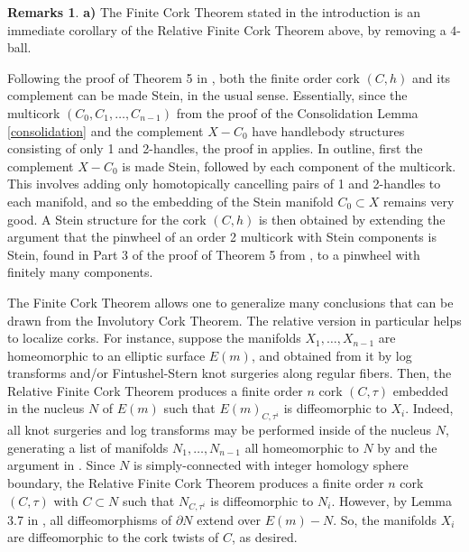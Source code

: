 \documentclass[11pt]{amsart}
\theoremstyle{definition}
\newtheorem{remarks}[theorem]{Remarks}
\begin{document}
\begin{remarks}
{\bf a)} The Finite Cork Theorem stated in the introduction is an immediate corollary of the Relative Finite Cork Theorem above, by removing a $4$-ball.

 Following the proof of Theorem 5 in \cite{akbulut-matveyev:positron}, both the finite order cork $(C,h)$ and its complement can be made Stein, in the usual sense. Essentially, since the multicork $(C_0, C_1, \dots, C_{n-1})$ from the proof of the Consolidation Lemma \ref{consolidation} and the complement $X-C_0$ have handlebody structures consisting of only 1 and 2-handles, the proof in \cite{akbulut-matveyev:positron} applies. In outline, first the complement $X-C_0$ is made Stein, followed by each component of the multicork. This involves adding only homotopically cancelling pairs of 1 and 2-handles to each manifold, and so the embedding of the Stein manifold $C_0 \subset X$ remains very good. A Stein structure for the cork $(C,h)$ is then obtained by extending the argument that the pinwheel of an order 2 multicork with Stein components is Stein, found in Part 3 of the proof of Theorem 5 from \cite{akbulut-matveyev:positron}, to a pinwheel with finitely many components. 

 The Finite Cork Theorem allows one to generalize many conclusions that can be drawn from the Involutory Cork Theorem. The relative version in particular helps to localize corks. For instance, suppose the manifolds $X_1, \dots, X_{n-1}$ are homeomorphic to an elliptic surface $E(m)$, and obtained from it by log transforms and/or Fintushel-Stern knot surgeries \cite{fs:knot-surgery} along regular fibers.  Then, the Relative Finite Cork Theorem produces a finite order $n$ cork $(C , \tau)$ embedded in the nucleus $N$ of $E(m)$ such that $E(m)_{C,\tau^i}$ is diffeomorphic to $X_i$. 
Indeed, all knot surgeries and log transforms may be performed inside of the nucleus $N$, generating a list of manifolds $N_1, \dots, N_{n-1}$ all homeomorphic to $N$ by \cite[Prop. 3.4]{gompf:nuclei} and the argument in \cite[pg.\,4]{fs:knot-surgery}.  Since $N$ is simply-connected with integer homology sphere boundary, 
the Relative Finite Cork Theorem produces a finite order $n$ cork $(C , \tau)$ with $C \subset N$ such that $N_{C,\tau^i}$ is diffeomorphic to $N_i$. However, by Lemma 3.7 in \cite{gompf:nuclei}, all diffeomorphisms of $\partial N$ extend over $E(m) - N$. So, the manifolds $X_i$ are diffeomorphic to the cork twists of $C$, as desired. 

\end{remarks}  
\end{document}
